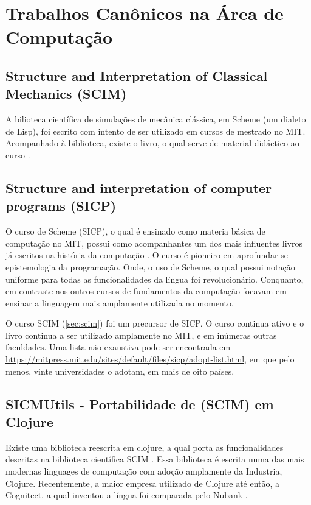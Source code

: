 \documentclass[
12pt,				%
openright,			%
oneside,			%
a4paper,			%
english,			%
french,				%
spanish,			%
brazil,				%
]{abntex2}
\begin{document}


\section{Trabalhos Canônicos na Área de Computação}

\subsection{Structure and Interpretation of Classical Mechanics (SCIM)}
\label{sec:scim}
A bilioteca científica de simulações de mecânica clássica, em Scheme (um dialeto de Lisp), foi escrito com intento de ser utilizado em cursos de mestrado no MIT. Acompanhado à biblioteca, existe o livro, o qual serve de material didáctico ao curso \cite{sussman2015structure}.

\subsection{Structure and interpretation of computer programs (SICP)}
O curso de Scheme (SICP), o qual é ensinado como materia básica de computação no MIT, possui como acompanhantes um dos mais influentes livros já escritos na história da computação \cite{abelson1996structure}. O curso é pioneiro em aprofundar-se epistemologia da programação. Onde, o uso de Scheme, o qual possui notação uniforme para todas as funcionalidades da língua foi revolucionário. Conquanto, em contraste aos outros cursos de fundamentos da computação focavam em ensinar a linguagem mais amplamente utilizada no momento.

O curso SCIM (\autoref{sec:scim}) foi um precursor de SICP. O curso continua ativo e o livro continua a ser utilizado amplamente no MIT, e em inúmeras outras faculdades. Uma lista não exaustiva pode ser encontrada em \url{https://mitpress.mit.edu/sites/default/files/sicp/adopt-list.html}, em que pelo menos, vinte universidades o adotam, em mais de oito países.

\subsection{SICMUtils - Portabilidade de (SCIM) em Clojure}
Existe uma biblioteca reescrita em clojure, a qual porta as funcionalidades descritas na biblioteca científica SCIM \cite{sicmutils2016github}. Essa biblioteca é escrita numa das mais modernas linguages de computação com adoção amplamente da Industria, Clojure. Recentemente, a maior empresa utilizado de Clojure até então, a Cognitect, a qual inventou a língua foi comparada pelo Nubank \cite{clojure2020}.
\end{document}
